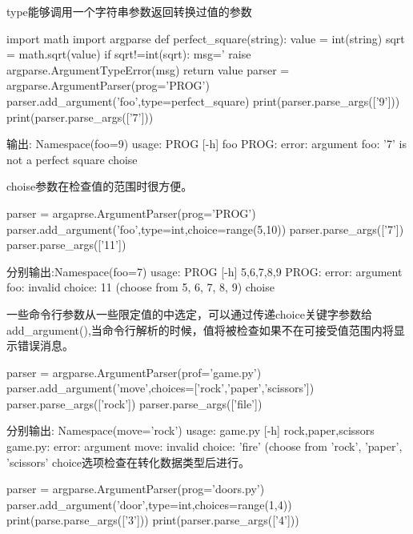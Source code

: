 type能够调用一个字符串参数返回转换过值的参数
\begin{python}
import math
import argparse
def perfect_square(string):
    value = int(string)
    sqrt = math.sqrt(value)
    if sqrt!=int(sqrt):
        msg='%
        raise argparse.ArgumentTypeError(msg)
    return value
parser = argparse.ArgumentParser(prog='PROG')
parser.add_argument('foo',type=perfect_square)
print(parser.parse_args(['9']))
print(parser.parse_args(['7']))

\end{python}
输出:
Namespace(foo=9)\newline
usage: PROG [-h] foo\newline
PROG: error: argument foo: '7' is not a perfect square\newline
choise\par
choise参数在检查值的范围时很方便。
\begin{python}
parser = argaprse.ArgumentParser(prog='PROG')
parser.add_argument('foo',type=int,choice=range(5,10))
parser.parse_args(['7'])
parser.parse_args(['11'])
\end{python}
分别输出:Namespace(foo=7)\newline
usage: PROG [-h] {5,6,7,8,9}\newline
PROG: error: argument foo: invalid choice: 11 (choose from 5, 6, 7, 8, 9)\newline
choise\par
一些命令行参数从一些限定值的中选定，可以通过传递choice关键字参数给add\_argument(),当命令行解析的时候，值将被检查如果不在可接受值范围内将显示错误消息。
\begin{python}
parser = argparse.ArgumentParser(prof='game.py')
parser.add_argument('move',choices=['rock','paper','scissors'])
parser.parse_args(['rock'])
parser.parse_args(['file'])
\end{python}
分别输出:\newline
Namespace(move='rock')\newline
usage: game.py [-h] {rock,paper,scissors}\newline
game.py: error: argument move: invalid choice: 'fire' (choose from 'rock',
'paper', 'scissors'\newline
choice选项检查在转化数据类型后进行。
\begin{python}
parser = argparse.ArgumentParser(prog='doors.py')
parser.add_argument('door',type=int,choices=range(1,4))
print(parse.parse_args(['3']))
print(parser.parse_args(['4']))
\end{python}
